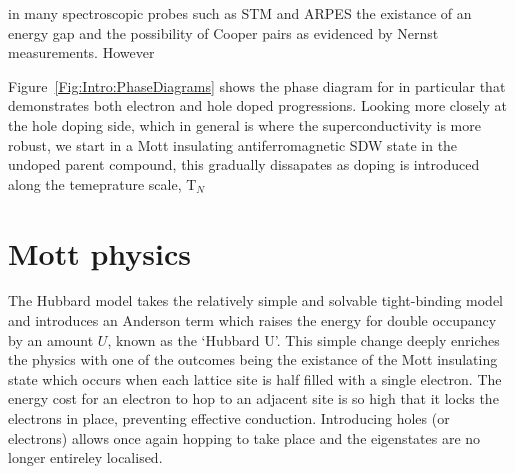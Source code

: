  in many spectroscopic probes such as \ac{STM} and \ac{ARPES} the existance of an energy gap and the possibility of Cooper pairs as evidenced by Nernst measurements. However 

Figure~\ref{Fig:Intro:PhaseDiagrams} shows the phase diagram for  in particular that demonstrates both electron and hole doped progressions. Looking more closely at the hole doping side, which in general is where the superconductivity is more robust, we start in a Mott insulating antiferromagnetic \ac{SDW} state in the undoped parent compound, this gradually dissapates as doping is introduced along the temeprature scale, T$_N$



\section{Mott physics}

The Hubbard model takes the relatively simple and solvable tight-binding model and introduces an Anderson term which raises the energy for double occupancy by an amount $U$, known as the `Hubbard U'. This simple change deeply enriches the physics with one of the outcomes being the existance of the Mott insulating state which occurs when each lattice site is half filled with a single electron. The energy cost for an electron to hop to an adjacent site is so high that it locks the electrons in place, preventing effective conduction. Introducing holes (or electrons) allows once again hopping to take place and the eigenstates are no longer entireley localised.
